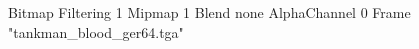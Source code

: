 {Bitmap
	{Filtering 1}
	{Mipmap 1}
	{Blend none}
	{AlphaChannel 0}
	{Frame "tankman_blood_ger64.tga"}
}
